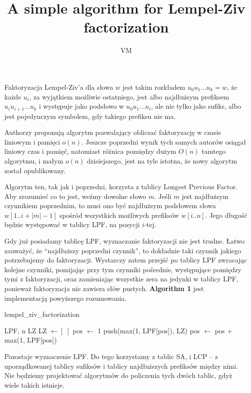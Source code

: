 \documentclass[a4paper,12pt]{article}
\title{A simple algorithm for Lempel-Ziv factorization}
\author{VM}
\theoremstyle{definition}
\begin{document}
\maketitle

Faktoryzacja Lempel-Ziv'a dla słowa $w$ jest takim rozkładem $u_0 u_1 ... u_k = w$,
że każde $u_i$, za wyjątkiem możliwie ostatniego,
jest albo najdłużsym prefiksem $u_i u_{i + 1} ... u_k$ i występuje jako podsłowo w $u_0 u_1 ... u_i$,
ale nie tylko jako sufiks,
albo jest pojedynczym symbolem, gdy takiego prefiksu nie ma.

Authorzy proponują algorytm pozwalający obliczać faktoryzację w czasie liniowym i pamięci $o(n)$.
Jeszcze poprzedni wynik tych samych autorów osiągał liniowy czas i pamięć,
natomiast różnica pomiędzy dużym $O(n)$ tamtego algorytmu, i małym $o(n)$ dzisiejszego, jest na tyle istotna,
że nowy algorytm został opublikowany.

Algorytm ten, tak jak i poprzedni, korzysta z tablicy Longest Previous Factor.
Aby zrozumieć co to jest, weźmy dowolne słowo $m$.
Jeśli $m$ jest najdłużsym czynnikiem poprzednim,
to musi ono być najdłużsym podsłowem słowa $w[1..i + |m| - 1]$ spośród wszystkich możliwych prefiksów $w[i..n]$.
Jego długość będzie występować w tablicy LPF, na pozycji $i$-tej.

Gdy już posiadamy tablicę LPF, wyznaczanie faktoryzacji nie jest trudne.
Łatwo zauważyć, że ``najdłuższy poprzedni czynnik'', to dokładnie taki czynnik jakiego potrzebujemy do faktoryzacji.
Wystarczy zatem przejść po tablicy LPF zwracając kolejne czynniki,
pomijając przy tym czynniki pośrednie, występujące pomiędzy tymi z faktoryzacji,
oraz zamieniając wszystkie zera na jedynki w tablicy LPF, ponieważ faktoryzacja nie zawiera słów pustych.
\textbf{Algorithm 1} jest implementacją powyższego rozumowania.

\begin{algorithm}
\caption{lempel\_ziv\_factorization}
\begin{algorithmic} 
\REQUIRE LPF, n
\ENSURE LZ
\STATE LZ $\gets [\;]$
\STATE pos $\gets$ 1
\STATE push(max(1, LPF[pos]), LZ)
\STATE pos $\gets$ pos + max(1, LPF[pos])
\ENDWHILE
\end{algorithmic}
\end{algorithm}

Pozostaje wyznaczenie LPF. Do tego korzystamy z tablic SA, i LCP --
z uporządkowanej tablicy sufiksów i tablicy najdłuższych prefiksów między nimi.
Nie będziemy projektować algorytmów do policzenia tych dwóch tablic,
gdyż wiele takich istnieje.
\end{document}
